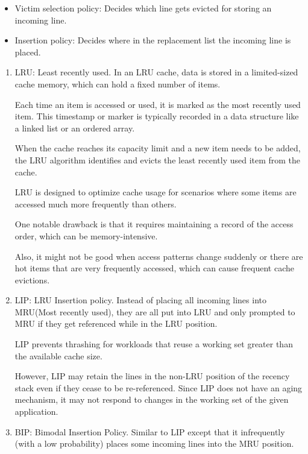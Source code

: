 \documentclass[letterpaper,12pt]{article}
\begin{document}
\begin{itemize}
    \item Victim selection policy: Decides which line gets evicted for storing an incoming line.
    \item Insertion policy: Decides where in the replacement list the incoming line is placed.
\end{itemize}

\begin{enumerate}
    \item LRU: Least recently used.
          In an LRU cache, data is stored in a limited-sized cache memory, which can hold a fixed number of items.

          Each time an item is accessed or used, it is marked as the most recently used item. This timestamp or marker is typically recorded in a data structure like a linked list or an ordered array.

          When the cache reaches its capacity limit and a new item needs to be added, the LRU algorithm identifies and evicts the least recently used item from the cache.

          LRU is designed to optimize cache usage for scenarios where some items are accessed much more frequently than others.

          One notable drawback is that it requires maintaining a record of the access order, which can be memory-intensive.

          Also, it might not be good when access patterns change suddenly or there are hot items that are very frequently accessed, which can cause frequent cache evictions.

    \item LIP: LRU Insertion policy.
          Instead of placing all incoming lines into MRU(Most recently used), they are all put into LRU and only prompted to MRU if they get referenced while in the LRU position.

          LIP prevents thrashing for workloads that reuse a working set greater than the available cache size.

          However, LIP may retain the lines in the non-LRU position of the recency stack even if they cease to be re-referenced. Since LIP does not have an aging mechanism, it may not respond to changes in the working set of the given application.

    \item BIP: Bimodal Insertion Policy.
          Similar to LIP except that it infrequently (with a low probability) places some incoming lines into the MRU position.


\end{enumerate}
\end{document}
